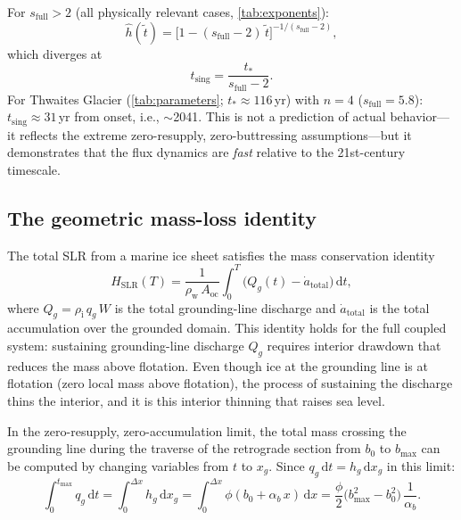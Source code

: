 \documentclass[11pt]{article}
\newcommand{\dd}{\mathrm{d}}
\newcommand{\Qg}{Q_g}
\newcommand{\qg}{q_g}
\newcommand{\hg}{h_g}
\newcommand{\hhat}{\hat{h}}
\newcommand{\xg}{x_g}
\newcommand{\rhoi}{\rho_{\mathrm{i}}}
\newcommand{\rhow}{\rho_{\mathrm{w}}}
\newcommand{\Aoc}{A_{\mathrm{oc}}}
\newcommand{\tdim}{\tilde{t}}
\begin{document}
For $s_{\mathrm{full}} > 2$ (all physically relevant cases, \cref{tab:exponents}):
\begin{equation}
	\hhat(\tdim) = \bigl[1 - (s_{\mathrm{full}}-2)\,\tdim\bigr]^{-1/(s_{\mathrm{full}}-2)},
	\label{eq:hhat_solution}
\end{equation}
which diverges at
\begin{equation}
	t_{\mathrm{sing}} = \frac{t_*}{s_{\mathrm{full}} - 2}.
	\label{eq:t_sing}
\end{equation}
For Thwaites Glacier (\cref{tab:parameters}; $t_* \approx 116$\,yr) with $n = 4$ ($s_{\mathrm{full}} = 5.8$): $t_{\mathrm{sing}} \approx 31$\,yr from onset, i.e., $\sim$2041. This is not a prediction of actual behavior---it reflects the extreme zero-resupply, zero-buttressing assumptions---but it demonstrates that the flux dynamics are \emph{fast} relative to the 21st-century timescale.

\subsection{The geometric mass-loss identity}

The total SLR from a marine ice sheet satisfies the mass conservation identity
\begin{equation}
	H_{\mathrm{SLR}}(T) = \frac{1}{\rhow\,\Aoc}\int_0^T\!\bigl(\Qg(t) - \dot{a}_{\mathrm{total}}\bigr)\,\dd t,
	\label{eq:slr_identity}
\end{equation}
where $\Qg = \rhoi\,\qg\,W$ is the total grounding-line discharge and $\dot{a}_{\mathrm{total}}$ is the total accumulation over the grounded domain. This identity holds for the full coupled system: sustaining grounding-line discharge $\Qg$ requires interior drawdown that reduces the mass above flotation. Even though ice at the grounding line is at flotation (zero local mass above flotation), the process of sustaining the discharge thins the interior, and it is this interior thinning that raises sea level.

In the zero-resupply, zero-accumulation limit, the total mass crossing the grounding line during the traverse of the retrograde section from $b_0$ to $b_{\max}$ can be computed by changing variables from $t$ to $\xg$. Since $\qg\,\dd t = \hg\,\dd\xg$ in this limit:
\begin{equation}
	\int_0^{t_{\max}}\!\!\qg\,\dd t
	= \int_0^{\Delta x}\!\hg\,\dd\xg
	= \int_0^{\Delta x}\!\phi(b_0 + \alpha_b\,x)\,\dd x
	= \frac{\phi}{2}\bigl(b_{\max}^2 - b_0^2\bigr)\,\frac{1}{\alpha_b}.
	\label{eq:traverse_integral}
\end{equation}
\end{document}
